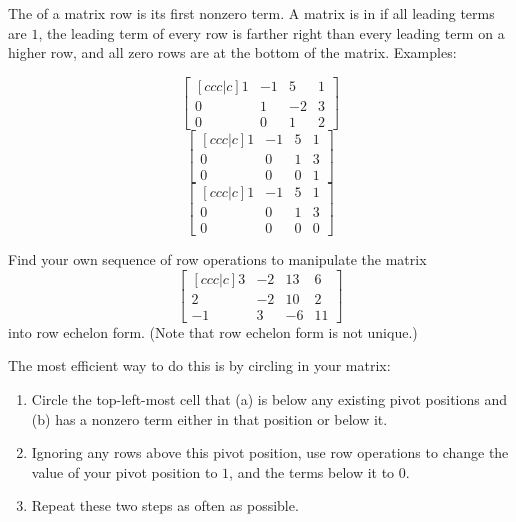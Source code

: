 \begin{applicationActivities}{2}{5}
\begin{definition}
  The  of a matrix row is its first nonzero term.
  A matrix is in  if all leading terms are \(1\),
  the leading term of every row
  is farther right than every leading term on a higher row, and all zero
  rows are at the bottom of the matrix. Examples:
  \begin{multicols}{3}\noindent
    \[
      \begin{bmatrix}[ccc|c]
        1 & -1 &  5 & 1 \\
        0 &  1 & -2 & 3 \\
        0 &  0 &  1 & 2
      \end{bmatrix}
    \]
    \[
      \begin{bmatrix}[ccc|c]
        1 & -1 &  5 & 1 \\
        0 &  0 &  1 & 3 \\
        0 &  0 &  0 & 1
      \end{bmatrix}
    \]
    \[
      \begin{bmatrix}[ccc|c]
        1 & -1 &  5 & 1 \\
        0 &  0 &  1 & 3 \\
        0 &  0 &  0 & 0
      \end{bmatrix}
    \]
  \end{multicols}
\end{definition}

\begin{activity}{10}
  Find your own sequence of row operations to manipulate the matrix
  \[
    \begin{bmatrix}[ccc|c]
      3 & -2 & 13 & 6 \\
      2 & -2 & 10 & 2 \\
      -1 & 3 & -6 & 11
    \end{bmatrix}
  \]
  into row echelon form. (Note that row echelon form is not unique.)

  The most efficient way to do this is by circling 
  in your matrix:
  \begin{enumerate}
    \item Circle the top-left-most cell that (a) is below any existing pivot
    positions and (b) has a nonzero term either in that position or below it.
    \item Ignoring any rows above this pivot position, use row operations
    to change the value of your pivot position to \(1\), and the terms below
    it to \(0\).
    \item Repeat these two steps as often as possible.
  \end{enumerate}
\end{activity}


\end{applicationActivities}

